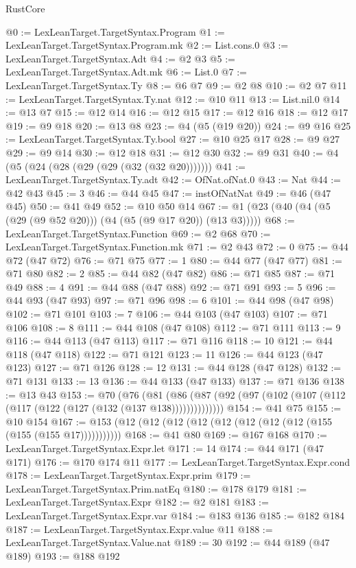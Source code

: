 \begin{lexlean}{RustCore}
\begin{coremodule}
@0 := LexLeanTarget.TargetSyntax.Program
@1 := LexLeanTarget.TargetSyntax.Program.mk
@2 := List.cons.{0}
@3 := LexLeanTarget.TargetSyntax.Adt
@4 := @2 @3
@5 := LexLeanTarget.TargetSyntax.Adt.mk
@6 := List.{0}
@7 := LexLeanTarget.TargetSyntax.Ty
@8 := @6 @7
@9 := @2 @8
@10 := @2 @7
@11 := LexLeanTarget.TargetSyntax.Ty.nat
@12 := @10 @11
@13 := List.nil.{0}
@14 := @13 @7
@15 := @12 @14
@16 := @12 @15
@17 := @12 @16
@18 := @12 @17
@19 := @9 @18
@20 := @13 @8
@23 := @4 (@5 (@19 @20))
@24 := @9 @16
@25 := LexLeanTarget.TargetSyntax.Ty.bool
@27 := @10 @25 @17
@28 := @9 @27
@29 := @9 @14
@30 := @12 @18
@31 := @12 @30
@32 := @9 @31
@40 := @4 (@5 (@24 (@28 (@29 (@29 (@32 (@32 @20)))))))
@41 := LexLeanTarget.TargetSyntax.Ty.adt
@42 := OfNat.ofNat.{0}
@43 := Nat
@44 := @42 @43
@45 := 3
@46 := @44 @45
@47 := instOfNatNat
@49 := @46 (@47 @45)
@50 := @41 @49
@52 := @10 @50 @14
@67 := @1 (@23 (@40 (@4 (@5 (@29 (@9 @52 @20))) (@4 (@5 (@9 @17 @20)) (@13 @3)))))
@68 := LexLeanTarget.TargetSyntax.Function
@69 := @2 @68
@70 := LexLeanTarget.TargetSyntax.Function.mk
@71 := @2 @43
@72 := 0
@75 := @44 @72 (@47 @72)
@76 := @71 @75
@77 := 1
@80 := @44 @77 (@47 @77)
@81 := @71 @80
@82 := 2
@85 := @44 @82 (@47 @82)
@86 := @71 @85
@87 := @71 @49
@88 := 4
@91 := @44 @88 (@47 @88)
@92 := @71 @91
@93 := 5
@96 := @44 @93 (@47 @93)
@97 := @71 @96
@98 := 6
@101 := @44 @98 (@47 @98)
@102 := @71 @101
@103 := 7
@106 := @44 @103 (@47 @103)
@107 := @71 @106
@108 := 8
@111 := @44 @108 (@47 @108)
@112 := @71 @111
@113 := 9
@116 := @44 @113 (@47 @113)
@117 := @71 @116
@118 := 10
@121 := @44 @118 (@47 @118)
@122 := @71 @121
@123 := 11
@126 := @44 @123 (@47 @123)
@127 := @71 @126
@128 := 12
@131 := @44 @128 (@47 @128)
@132 := @71 @131
@133 := 13
@136 := @44 @133 (@47 @133)
@137 := @71 @136
@138 := @13 @43
@153 := @70
    (@76 (@81 (@86 (@87 (@92 (@97 (@102 (@107 (@112 (@117 (@122 (@127 (@132 (@137 @138))))))))))))))
@154 := @41 @75
@155 := @10 @154
@167 := @153 (@12 (@12 (@12 (@12 (@12 (@12 (@12 (@12 (@155 (@155 (@155 @17)))))))))))
@168 := @41 @80
@169 := @167 @168
@170 := LexLeanTarget.TargetSyntax.Expr.let
@171 := 14
@174 := @44 @171 (@47 @171)
@176 := @170 @174 @11
@177 := LexLeanTarget.TargetSyntax.Expr.cond
@178 := LexLeanTarget.TargetSyntax.Expr.prim
@179 := LexLeanTarget.TargetSyntax.Prim.natEq
@180 := @178 @179
@181 := LexLeanTarget.TargetSyntax.Expr
@182 := @2 @181
@183 := LexLeanTarget.TargetSyntax.Expr.var
@184 := @183 @136
@185 := @182 @184
@187 := LexLeanTarget.TargetSyntax.Expr.value @11
@188 := LexLeanTarget.TargetSyntax.Value.nat
@189 := 30
@192 := @44 @189 (@47 @189)
@193 := @188 @192

\end{coremodule}
\end{lexlean}
